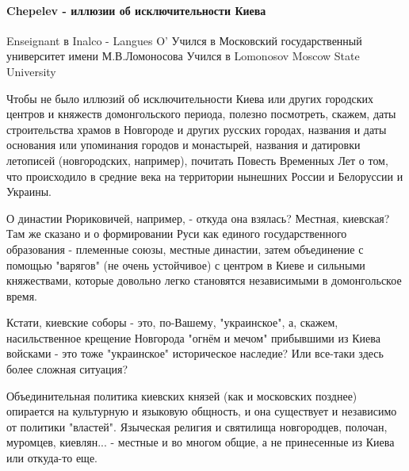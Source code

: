  
 
 
 
 
\paragraph{Chepelev - иллюзии об исключительности Киева}

\begin{itemize}
Enseignant в Inalco - Langues O'
Учился в Московский государственный университет имени М.В.Ломоносова
Учился в Lomonosov Moscow State University
\par

Чтобы не было иллюзий об исключительности Киева или других городских центров и
княжеств домонгольского периода, полезно посмотреть, скажем, даты строительства
храмов в Новгороде и других русских городах, названия и даты основания или
упоминания городов и монастырей, названия и датировки летописей (новгородских,
например), почитать Повесть Временных Лет о том, что происходило в средние века
на территории нынешних России и Белоруссии и Украины. 

О династии Рюриковичей, например, - откуда она взялась? Местная, киевская? Там
же сказано и о формировании Руси как единого государственного образования -
племенные союзы, местные династии, затем объединение с помощью "варягов" (не
очень устойчивое) с центром в Киеве и сильными княжествами, которые довольно
легко становятся независимыми в домонгольское время. 

Кстати, киевские соборы - это, по-Вашему, "украинское", а, скажем,
насильственное крещение Новгорода "огнём и мечом" прибывшими из Киева войсками
- это тоже "украинское" историческое наследие? Или все-таки здесь более сложная
ситуация? 

Объединительная политика киевских князей (как и московских позднее) опирается
на культурную и языковую общность, и она существует и независимо от политики
"властей". Языческая религия и святилища новгородцев, полочан, муромцев,
киевлян... - местные и во многом общие, а не принесенные из Киева или откуда-то
еще.


\end{itemize}
